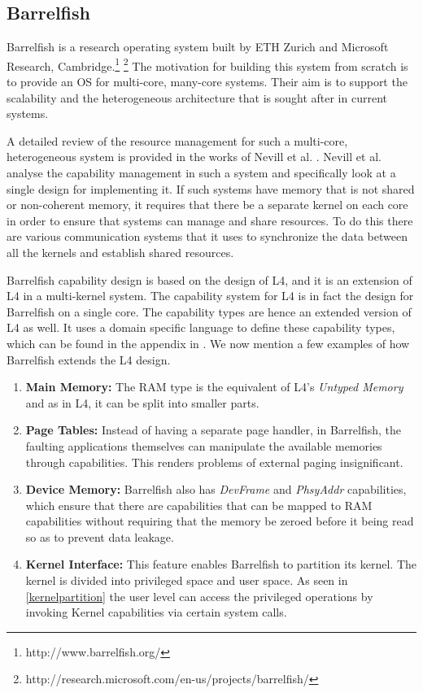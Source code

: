 \subsection{Barrelfish}
\label{subsec:Barrelfish}
Barrelfish is a research operating system built by ETH Zurich and Microsoft Research, Cambridge.\footnote{http://www.barrelfish.org/} \footnote{http://research.microsoft.com/en-us/projects/barrelfish/} The motivation for building this system from scratch is to provide an OS for multi-core, many-core systems. Their aim is to support the scalability and the heterogeneous architecture that is sought after in current systems. 

A detailed review of the resource management for such a multi-core, heterogeneous system is provided in the works of Nevill et al. \cite{nevillmasters}. Nevill et al. analyse the capability management in such a system and specifically look at a single design for implementing it. If such systems have memory that is not shared or non-coherent memory, it requires that there be a separate kernel on each core in order to ensure that systems can manage and share resources. To do this there are various communication systems that it uses to synchronize the data between all the kernels and establish shared resources. 

Barrelfish capability design is based on the design of L4, and it is an extension of L4 in a multi-kernel system. The capability system for L4 is in fact the design for Barrelfish on a single core. The capability types are hence an extended version of L4 as well. It uses a domain specific language to define these capability types, which can be found in the appendix in \cite{nevillmasters}. We now mention a few examples of how Barrelfish extends the L4 design.

\begin{enumerate}
\item \textbf{Main Memory:} The RAM type is the equivalent of L4's \textit{Untyped Memory} and as in L4, it can be split into smaller parts.
\item \textbf{Page Tables:} Instead of having a separate page handler, in Barrelfish, the faulting applications themselves can manipulate the available memories through capabilities. This renders problems of external paging insignificant.
\item \textbf{Device Memory:} Barrelfish also has \textit{DevFrame} and \textit{PhsyAddr} capabilities, which ensure that there are capabilities that can be mapped to RAM capabilities without requiring that the memory be zeroed before it being read so as to prevent data leakage.
\item \textbf{Kernel Interface:} This feature enables Barrelfish to partition its kernel. The kernel is divided into privileged space and user space. As seen in \ref{kernelpartition} the user level can access the privileged operations by invoking Kernel capabilities via certain system calls.
\end{enumerate}

